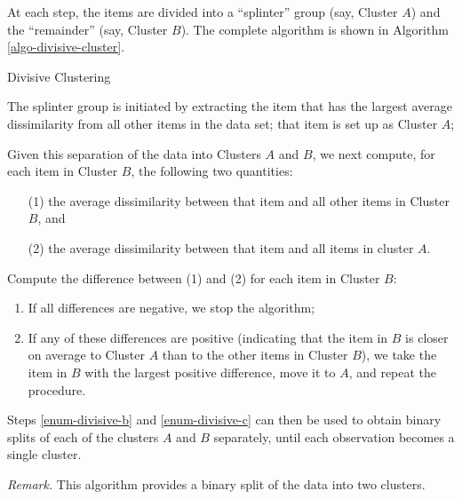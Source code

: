 \documentclass[12pt]{article}
\begin{document}
\begin{enumerate}[label=\textbf{\arabic*.}]
	At each step, the items are divided into a ``splinter'' group (say, Cluster $A$) and the ``remainder'' (say, Cluster $B$). The complete algorithm is shown in Algorithm \ref{algo-divisive-cluster}. 
	
	\begin{minipage}{\linewidth}
		\begin{algorithm}[H]
			\caption{Divisive Clustering}\label{algo-divisive-cluster}
			\begin{algorithmic}[1]
				\STATE The splinter group is initiated by extracting the item that has the largest average dissimilarity from all other items in the data set; that item is set up as Cluster $A$; 
				
				\STATE \label{enum-divisive-b} Given this separation of the data into Clusters $A$ and $B$, we next compute, for each item in Cluster $B$, the following two quantities:
				\begin{enumerate}
					\item[(1)] the average dissimilarity between that item and all other items in Cluster $B$, and 
					\item[(2)] the average dissimilarity between that item and all items in cluster $A$. 
				\end{enumerate}
				
				\STATE \label{enum-divisive-c} Compute the difference between (1) and (2) for each item in Cluster $B$: 
				\begin{enumerate}
					\item If all differences are negative, we stop the algorithm; 
					\item If any of these differences are positive (indicating that the item in $B$ is closer on average to Cluster $A$ than to the other items in Cluster $B$), we take the item in $B$ with the largest positive difference, move it to $A$, and repeat the procedure. 
				\end{enumerate}
				
				\STATE Steps \ref{enum-divisive-b} and \ref{enum-divisive-c} can then be used to obtain binary splits of each of the clusters $A$ and $B$ separately, until each observation becomes a single cluster. 
				
			\end{algorithmic}
		\end{algorithm}
	\end{minipage}
	
	\textit{Remark.} This algorithm provides a binary split of the data into two clusters. 

\end{enumerate}
\end{document}
